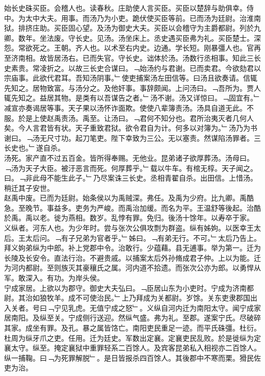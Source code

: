 \documentclass{zhvt-classic}
\begin{document}
\hspace*{2em}始长史硃买臣。会稽人也。读春秋。庄助使人言买臣。买臣以楚辞与助俱幸。侍中。为太中大夫。用事。而汤乃为小吏。跪伏使买臣等前。已而汤为廷尉。治淮南狱。排挤庄助。买臣固心望。及汤为御史大夫。买臣以会稽守为主爵都尉。列於九卿。数年。坐法废。守长史。见汤。汤坐床上。丞史遇买臣弗为礼。买臣楚士。深怨。常欲死之。王朝。齐人也。以术至右内史。边通。学长短。刚暴彊人也。官再至济南相。故皆居汤右。已而失官。守长史。诎体於汤。汤数行丞相事。知此三长史素贵。常凌折之。以故三长史合谋曰。﹁始汤约与君谢。已而卖君。今欲劾君以宗庙事。此欲代君耳。吾知汤阴事。﹂使吏捕案汤左田信等。曰汤且欲奏请。信辄先知之。居物致富。与汤分之。及他奸事。事辞颇闻。上问汤曰。﹁吾所为。贾人辄先知之。益居其物。是类有以吾谋告之者。﹂汤不谢。汤又详惊曰。﹁固宜有。﹂减宣亦奏谒居等事。天子果以汤怀诈面欺。使使八辈簿责汤。汤具自道无此。不服。於是上使赵禹责汤。禹至。让汤曰。﹁君何不知分也。君所治夷灭者几何人矣。今人言君皆有状。天子重致君狱。欲令君自为计。何多以对簿为。﹂汤乃为书谢曰。﹁汤无尺寸功。起刀笔吏。陛下幸致为三公。无以塞责。然谋陷汤罪者。三长史也。﹂遂自杀。\\
\hspace*{2em}汤死。家产直不过五百金。皆所得奉赐。无他业。昆弟诸子欲厚葬汤。汤母曰。﹁汤为天子大臣。被汙恶言而死。何厚葬乎。﹂载以牛车。有棺无椁。天子闻之。曰。﹁非此母不能生此子。﹂乃尽案诛三长史。丞相青翟自杀。出田信。上惜汤。稍迁其子安世。\\
\hspace*{2em}赵禹中废。已而为廷尉。始条侯以为禹贼深。弗任。及禹为少府。比九卿。禹酷急。至晚节。事益多。吏务为严峻。而禹治加缓。而名为平。王温舒等後起。治酷於禹。禹以老。徙为燕相。数岁。乱悖有罪。免归。後汤十馀年。以寿卒于家。\\
\hspace*{2em}义纵者。河东人也。为少年时。尝与张次公俱攻剽为群盗。纵有姊姁。以医幸王太后。王太后问。﹁有子兄弟为官者乎。﹂姊曰。﹁有弟无行。不可。﹂太后乃告上。拜义姁弟纵为中郎。补上党郡中令。治敢行。少蕴藉。县无逋事。举为第一。迁为长陵及长安令。直法行治。不避贵戚。以捕案太后外孙脩成君子仲。上以为能。迁为河内都尉。至则族灭其豪穰氏之属。河内道不拾遗。而张次公亦为郎。以勇悍从军。敢深入。有功。为岸头侯。\\
\hspace*{2em}宁成家居。上欲以为郡守。御史大夫弘曰。﹁臣居山东为小吏时。宁成为济南都尉。其治如狼牧羊。成不可使治民。﹂上乃拜成为关都尉。岁馀。关东吏隶郡国出入关者。号曰﹁宁见乳虎。无值宁成之怒﹂。义纵自河内迁为南阳太守。闻宁成家居南阳。及纵至关。宁成侧行送迎。然纵气盛。弗为礼。至郡。遂案宁氏。尽破碎其家。成坐有罪。及孔。暴之属皆饹亡。南阳吏民重足一迹。而平氏硃彊。杜衍。杜周为纵牙爪之吏。任用。迁为廷史。军数出定襄。定襄吏民乱败。於是徙纵为定襄太守。纵至。掩定襄狱中重罪轻系二百馀人。及宾客昆弟私入相视亦二百馀人。纵一捕鞠。曰﹁为死罪解脱﹂。是日皆报杀四百馀人。其後郡中不寒而栗。猾民佐吏为治。\\
\end{document}
